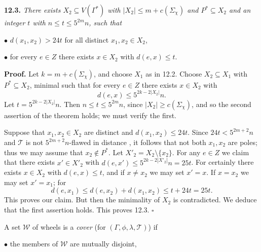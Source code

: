 \textbf{12.3.} \textit{There exists $X_2 \subseteq V(\Gamma^*)$ with $|X_2| \le m + c(\Sigma_\chi)$ and $P^* \subseteq X_2$ and an integer $t$ with $n \le t \le 5^{2m}n$, such that}

\hspace*{12pt}$\bullet$ $d(x_1, x_2) > 24t$ for all distinct $x_1, x_2 \in X_2$,

\hspace*{12pt}$\bullet$ for every $e \in Z$ there exists $x \in X_2$ with $d(e, x) \le t$.

\textbf{Proof.} Let $k = m + c(\Sigma_\chi)$, and choose $X_1$ as in 12.2. Choose $X_2 \subseteq X_1$ with $P^* \subseteq X_2$, minimal such that for every $e \in Z$ there exists $x \in X_2$ with
\begin{equation*}
d(e, x) \le 5^{2k-2|X_2|}n.
\end{equation*}
Let $t = 5^{2k-2|X_2|}n$. Then $n \le t \le 5^{2m}n$, since $|X_2| \ge c(\Sigma_\chi)$, and so the second assertion of the theorem holds; we must verify the first.

Suppose that $x_1, x_2 \in X_2$ are distinct and $d(x_1, x_2) \le 24t$. Since $24t < 5^{2m+2}n$ and $\mathscr{T}$ is not $5^{2m+2}n$-flawed in distance , it follows that not both $x_1, x_2$ are poles; thus we may assume that $x_2 \notin P^*$. Let $X'_2 = X_2 \setminus \{x_2\}$. For any $e \in Z$ we claim that there exists $x' \in X'_2$ with $d(e, x') \le 5^{2k-2|X'_2|}n = 25t$. For certainly there exists $x \in X_2$ with $d(e, x) \le t$, and if $x \ne x_2$ we may set $x' = x$. If $x = x_2$ we may set $x' = x_1$; for
\begin{equation*}
d(e, x_1) \le d(e, x_2) + d(x_1, x_2) \le t + 24t = 25t.
\end{equation*}
This proves our claim. But then the minimality of $X_2$ is contradicted. We deduce that the first assertion holds. This proves 12.3. $\square$

A set $\mathscr{W}$ of wheels is a \textit{cover} (for $(\Gamma, \phi, \lambda, \mathscr{T})$) if

\hspace*{12pt}$\bullet$ the members of $\mathscr{W}$ are mutually disjoint,

